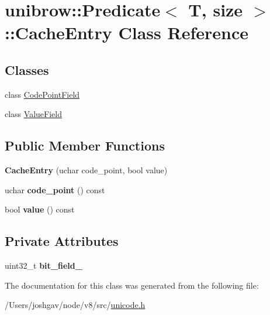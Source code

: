 \hypertarget{classunibrow_1_1_predicate_1_1_cache_entry}{}\section{unibrow\+:\+:Predicate$<$ T, size $>$\+:\+:Cache\+Entry Class Reference}
\label{classunibrow_1_1_predicate_1_1_cache_entry}
\subsection*{Classes}
\begin{DoxyCompactItemize}
\item 
class \hyperlink{classunibrow_1_1_predicate_1_1_cache_entry_1_1_code_point_field}{Code\+Point\+Field}
\item 
class \hyperlink{classunibrow_1_1_predicate_1_1_cache_entry_1_1_value_field}{Value\+Field}
\end{DoxyCompactItemize}
\subsection*{Public Member Functions}
\begin{DoxyCompactItemize}
\item 
{\bfseries Cache\+Entry} (uchar code\+\_\+point, bool value)\hypertarget{classunibrow_1_1_predicate_1_1_cache_entry_a8102b885251fc18291f6dd6d6ad3fd52}{}\label{classunibrow_1_1_predicate_1_1_cache_entry_a8102b885251fc18291f6dd6d6ad3fd52}

\item 
uchar {\bfseries code\+\_\+point} () const \hypertarget{classunibrow_1_1_predicate_1_1_cache_entry_ad358d6ea0a0c5949eec050c683e24e3e}{}\label{classunibrow_1_1_predicate_1_1_cache_entry_ad358d6ea0a0c5949eec050c683e24e3e}

\item 
bool {\bfseries value} () const \hypertarget{classunibrow_1_1_predicate_1_1_cache_entry_a99b036ed6d7539faece02c8f03be72b3}{}\label{classunibrow_1_1_predicate_1_1_cache_entry_a99b036ed6d7539faece02c8f03be72b3}

\end{DoxyCompactItemize}
\subsection*{Private Attributes}
\begin{DoxyCompactItemize}
\item 
uint32\+\_\+t {\bfseries bit\+\_\+field\+\_\+}\hypertarget{classunibrow_1_1_predicate_1_1_cache_entry_ac7d1b3fbf14a8c45bf1050f878bf5cfd}{}\label{classunibrow_1_1_predicate_1_1_cache_entry_ac7d1b3fbf14a8c45bf1050f878bf5cfd}

\end{DoxyCompactItemize}


The documentation for this class was generated from the following file\+:\begin{DoxyCompactItemize}
\item 
/\+Users/joshgav/node/v8/src/\hyperlink{unicode_8h}{unicode.\+h}\end{DoxyCompactItemize}
